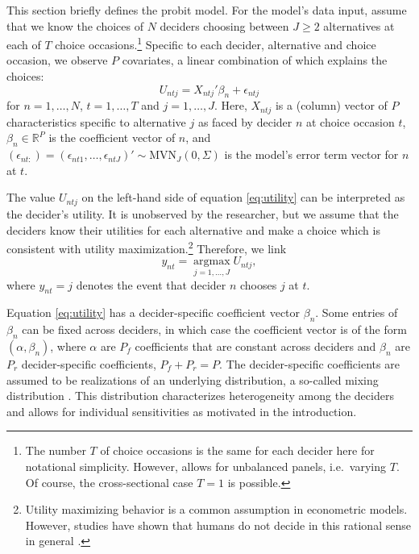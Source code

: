 \documentclass[article,shortnames]{jss}
\begin{document}
This section briefly defines the probit model. For the model's data input, assume that we know the choices of $N$ deciders choosing between $J \geq 2$ alternatives at each of $T$ choice occasions.\footnote{The number $T$ of choice occasions is the same for each decider here for notational simplicity. However,  allows for unbalanced panels, i.e.\ varying $T$. Of course, the cross-sectional case $T = 1$ is possible.} Specific to each decider, alternative and choice occasion, we observe $P$ covariates, a linear combination of which explains the choices:
\begin{equation}
  \label{eq:utility}
  U_{ntj} = X_{ntj}'\beta_n + \epsilon_{ntj}
\end{equation}
for $n=1,\dots,N$, $t=1,\dots,T$ and $j=1,\dots,J$. Here, $X_{ntj}$ is a (column) vector of $P$ characteristics specific to alternative $j$ as faced by decider $n$ at choice occasion $t$, $\beta_n \in {\mathbb R}^{P}$ is the coefficient vector of $n$, and $(\epsilon_{nt:}) = (\epsilon_{nt1},\dots,\epsilon_{ntJ})' \sim \text{MVN}_{J} (0,\Sigma)$ is the model's error term vector for $n$ at $t$.

The value $U_{ntj}$ on the left-hand side of equation \eqref{eq:utility} can be interpreted as the decider's utility. It is unobserved by the researcher, but we assume that the deciders know their utilities for each alternative and make a choice which is consistent with utility maximization.\footnote{Utility maximizing behavior is a common assumption in econometric models. However, studies have shown that humans do not decide in this rational sense in general \citep{Hewig:2011}.} Therefore, we link
\begin{equation}
   \label{eq:link}
   y_{nt} = \operatorname*{argmax}_{j = 1,\dots,J} U_{ntj},
\end{equation}
where $y_{nt}=j$ denotes the event that decider $n$ chooses $j$ at $t$.

Equation \eqref{eq:utility} has a decider-specific coefficient vector $\beta_n$. Some entries of $\beta_n$ can be fixed across deciders, in which case the coefficient vector is of the form $(\alpha, \beta_n)$, where $\alpha$ are $P_f$ coefficients that are constant across deciders and $\beta_n$ are $P_r$ decider-specific coefficients, $P_f + P_r = P$. The decider-specific coefficients are assumed to be realizations of an underlying distribution, a so-called mixing distribution \citep[Ch.\ 6]{Train:2009}. This distribution characterizes heterogeneity among the deciders and allows for individual sensitivities as motivated in the introduction.
\end{document}

